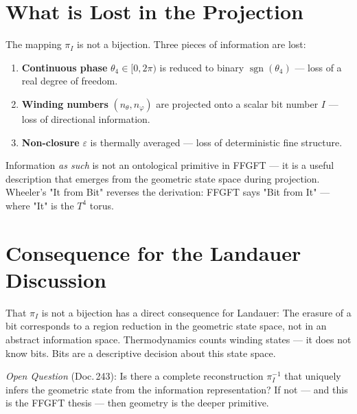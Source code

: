 \section{What is Lost in the Projection}

The mapping $\pi_I$ is not a bijection. Three pieces of information are lost:

\begin{enumerate}
  \item \textbf{Continuous phase} $\theta_4 \in [0, 2\pi)$ is reduced to binary
    $\operatorname{sgn}(\theta_4)$ --- loss of a real degree of freedom.
  \item \textbf{Winding numbers} $(n_\theta, n_\varphi)$ are projected onto a scalar bit number
    $I$ --- loss of directional information.
  \item \textbf{Non-closure} $\varepsilon$ is thermally averaged ---
    loss of deterministic fine structure.
\end{enumerate}

\begin{keyresult}
Information \emph{as such} is not an ontological primitive in FFGFT ---
it is a useful description that emerges from the
geometric state space during projection. Wheeler's "It from Bit" reverses the
derivation: FFGFT says "Bit from It" --- where "It" is the $T^4$ torus.
\end{keyresult}

\section{Consequence for the Landauer Discussion}

That $\pi_I$ is not a bijection has a direct consequence for
Landauer: The erasure of a bit corresponds to a region reduction in the
geometric state space, not in an abstract information space.
Thermodynamics counts winding states --- it does not know bits.
Bits are a descriptive decision about this state space.

\textit{Open Question} (Doc.\,243): Is there a complete reconstruction
$\pi_I^{-1}$ that uniquely infers the geometric state from the
information representation? If not --- and this is the
FFGFT thesis --- then geometry is the deeper primitive.